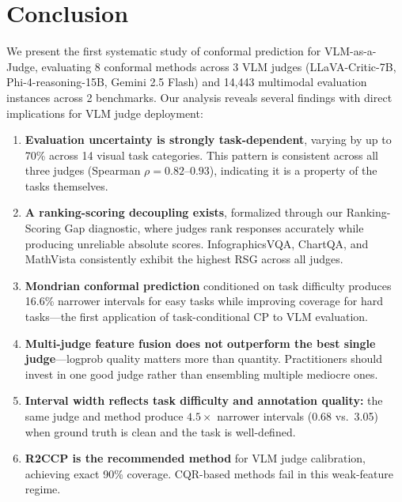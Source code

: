 \documentclass{article}
\begin{document}
\section{Conclusion}
\label{sec:conclusion}

We present the first systematic study of conformal prediction for VLM-as-a-Judge, evaluating 8 conformal methods across 3 VLM judges (LLaVA-Critic-7B, Phi-4-reasoning-15B, Gemini 2.5 Flash) and 14,443 multimodal evaluation instances across 2 benchmarks. Our analysis reveals several findings with direct implications for VLM judge deployment:

\begin{enumerate}[leftmargin=*,itemsep=2pt,topsep=2pt]
\item \textbf{Evaluation uncertainty is strongly task-dependent}, varying by up to 70\% across 14 visual task categories. This pattern is consistent across all three judges (Spearman $\rho = 0.82$--$0.93$), indicating it is a property of the tasks themselves.

\item \textbf{A ranking-scoring decoupling exists}, formalized through our Ranking-Scoring Gap diagnostic, where judges rank responses accurately while producing unreliable absolute scores. InfographicsVQA, ChartQA, and MathVista consistently exhibit the highest RSG across all judges.

\item \textbf{Mondrian conformal prediction} conditioned on task difficulty produces 16.6\% narrower intervals for easy tasks while improving coverage for hard tasks---the first application of task-conditional CP to VLM evaluation.

\item \textbf{Multi-judge feature fusion does not outperform the best single judge}---logprob quality matters more than quantity. Practitioners should invest in one good judge rather than ensembling multiple mediocre ones.

\item \textbf{Interval width reflects task difficulty and annotation quality:} the same judge and method produce $4.5\times$ narrower intervals (0.68 vs.\ 3.05) when ground truth is clean and the task is well-defined.

\item \textbf{R2CCP is the recommended method} for VLM judge calibration, achieving exact 90\% coverage. CQR-based methods fail in this weak-feature regime.
\end{enumerate}
\end{document}
